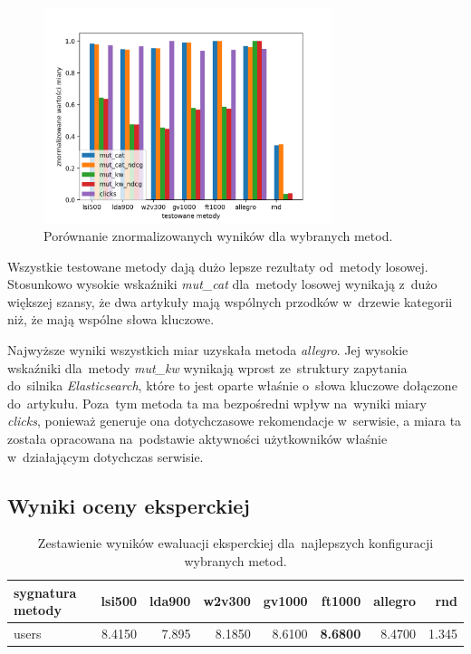 \documentclass[pl]{minipw} %
\begin{document}
\begin{figure}[H]
	\centering
	\includegraphics[width=0.75\textwidth]{img/results/lsi500_lda900_w2v300_gv1000_ft1000_allegro_rnd_.png}
	\caption{Porównanie znormalizowanych wyników dla wybranych metod.}
\end{figure}

Wszystkie testowane metody dają dużo lepsze rezultaty od~metody losowej. Stosunkowo wysokie wskaźniki \textit{mut\_cat} dla~metody losowej wynikają z~dużo większej szansy, że dwa artykuły mają wspólnych przodków w~drzewie kategorii niż, że mają wspólne słowa kluczowe.

Najwyższe wyniki wszystkich miar uzyskała metoda \textit{allegro}. Jej wysokie wskaźniki dla~metody \textit{mut\_kw} wynikają wprost ze~struktury zapytania do~silnika \textit{Elasticsearch}, które to jest oparte właśnie o~słowa kluczowe dołączone do~artykułu. Poza~tym metoda ta ma bezpośredni wpływ na~wyniki miary \textit{clicks}, ponieważ generuje ona dotychczasowe rekomendacje w~serwisie, a miara ta została opracowana na~podstawie aktywności użytkowników właśnie w~działającym dotychczas serwisie.

\subsection{Wyniki oceny eksperckiej}

\begin{table}[H]
	\centering
	\begin{tabular}{lrrrrrrr}
		\hline
		sygnatura metody &   lsi500 &   lda900 &   w2v300 &   gv1000 &   ft1000 &   allegro &   rnd \\
		\hline
		users &    8.4150 &    7.895 &    8.1850 &     8.6100 &     \textbf{8.6800} &      8.4700 & 1.345 \\
		\hline
	\end{tabular}
	\caption{Zestawienie wyników ewaluacji eksperckiej dla~najlepszych konfiguracji wybranych metod.}
\end{table}
\end{document}
